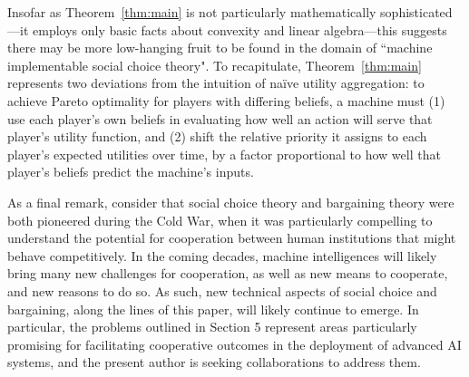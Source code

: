\documentclass{article}  %
\newcommand{\thm}[1]{Theorem~\ref{thm:#1}}
\begin{document}
Insofar as \thm{main} is not particularly mathematically sophisticated---it employs only basic facts about convexity and linear algebra---this suggests there may be more low-hanging fruit to be found in the domain of ``machine implementable social choice theory".  To recapitulate, \thm{main} represents two deviations from the intuition of na\"{i}ve utility aggregation: to achieve Pareto optimality for players with differing beliefs, a machine must (1) use each player's own beliefs in evaluating how well an action will serve that player's utility function, and (2) shift the relative priority it assigns to each player's expected utilities over time, by a factor proportional to how well that player's beliefs predict the machine's inputs.

As a final remark, consider that social choice theory and bargaining theory were both pioneered during the Cold War, when it was particularly compelling to understand the potential for cooperation between human institutions that might behave competitively.  In the coming decades, machine intelligences will likely bring many new challenges for cooperation, as well as new means to cooperate, and new reasons to do so.  As such, new technical aspects of social choice and bargaining, along the lines of this paper, will likely continue to emerge.  In particular, the problems outlined in Section 5 represent areas particularly promising for facilitating cooperative outcomes in the deployment of advanced AI systems, and the present author is seeking collaborations to address them.








\end{document}
